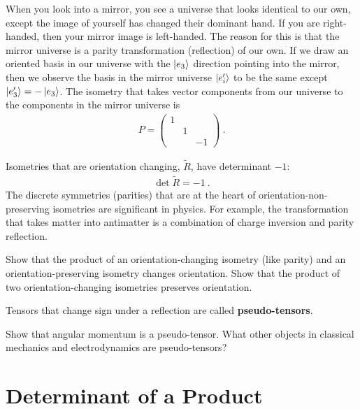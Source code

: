 \documentclass[12pt, oneside]{report}    %
\let\oldsection\section
\def\section{%
  \setcounter{sidenote}{1}%
  \oldsection
}
\begin{document}
\begin{example} When you look into a mirror, you see a universe that looks identical to our own, except the image of yourself has changed their dominant hand. If you are right-handed, then your mirror image is left-handed. The reason for this is that the mirror universe is a parity transformation (reflection) of our own. If we draw an oriented basis in our universe with the $\left|e_3\right\rangle$ direction pointing into the mirror, then we observe the basis in the mirror universe $\left|e'_i\right\rangle$ to be the same except $\left|e'_3\right\rangle = -\left|e_3\right\rangle$. The isometry that takes vector components from our universe to the components in the mirror universe is
\begin{align}
    P = \begin{pmatrix}
        1 & & \\
        & 1 & \\
        & & -1
    \end{pmatrix} \ .
\end{align}
\end{example}

Isometries that are orientation changing, $\tilde R$, have determinant $-1$:
\begin{align}
\det \tilde R = -1 \ .     
\end{align}
The discrete symmetries (parities) that are at the heart of orientation-non-preserving isometries are significant in physics.  For example, the transformation that takes matter into antimatter is a combination of charge inversion and parity reflection. 

\begin{example}
Show that the product of an orientation-changing isometry (like parity) and an orientation-preserving isometry changes orientation. Show that the product of two orientation-changing isometries preserves orientation.
\end{example}

Tensors that change sign under a reflection are called \textbf{pseudo-tensors}. 
\begin{exercise}
Show that angular momentum is a pseudo-tensor. What other objects in classical mechanics and electrodynamics are pseudo-tensors?
\end{exercise}


\section{Determinant of a Product}
\label{sec:determinant:of:product}
\end{document}
